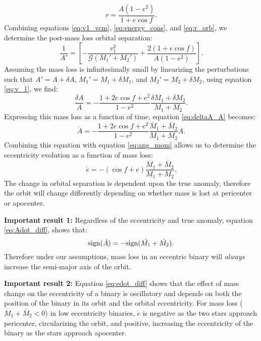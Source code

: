 \documentclass{emulateapj}
\begin{document}
\begin{equation}
r = \frac{A (1 - e^2)}{1+e \cos f }. \label{eq:r_orb}
\end{equation}
Combining equations \ref{eq:v1_vcm}, \ref{eq:energy_cons}, and \ref{eq:r_orb}, we determine the post-mass loss orbital separation:
\begin{equation}
\frac{1}{A'} = \left[ -\frac{v_1^2}{\mathcal{G}(M_1' + M_2')} + \frac{2(1 + e \cos f)}{A(1 - e^2)} \right].
\end{equation}
Assuming the mass loss is infinitesimally small by linearizing the perturbations such that $A' = A + \delta A$, $M_1' = M_1 + \delta M_1$, and $M_2' = M_2 + \delta M_2$, using equation \ref{eq:v_1}, we find:
\begin{equation}
\frac{\delta A}{A} = - \frac{1 + 2e \cos f + e^2}{1-e^2} \frac{\delta M_1 + \delta M_2}{M_1 + M_2}. \label{eq:deltaA_A}
\end{equation}
Expressing this mass loss as a function of time, equation \ref{eq:deltaA_A} becomes:
\begin{equation}
\dot{A} = - \frac{1 + 2e \cos f + e^2}{1 - e ^2} \frac{\dot{M_1} + \dot{M_2}}{M_1 + M_2} A. \label{eq:Adot_diff}
\end{equation}
Combining this equation with equation \ref{eq:ang_mom} allows us to determine the eccentricity evolution as a function of mass loss:
\begin{equation}
\dot{e} = - (\cos f + e) \frac{\dot{M_1} + \dot{M_2}}{M_1 + M_2}. \label{eq:edot_diff}
\end{equation}
The change in orbital separation is dependent upon the true anomaly, therefore the orbit will change differently depending on whether mass is lost at pericenter or apocenter.

{\bf Important result 1:}
Regardless of the eccentricity and true anomaly, equation \ref{eq:Adot_diff}, shows that:
\begin{equation}
{\rm sign} ( \dot{A}) = -{\rm sign} (\dot{M_1} + \dot{M_2}).
\end{equation}
Therefore under our assumptions, mass loss in an eccentric binary will {\it always} increase the semi-major axis of the orbit.

{\bf Important result 2:}
Equation \ref{eq:edot_diff} shows that the effect of mass change on the eccentricity of a binary is oscillatory and depends on both the position of the binary in its orbit and the orbital eccentricity. For mass loss ($\dot{M_1} + \dot{M_2} < 0$) in low eccentricity binaries, $\dot{e}$ is negative as the two stars approach pericenter, circularizing the orbit, and positive, increasing the eccentricity of the binary as the stars approach apocenter. 
\end{document}
